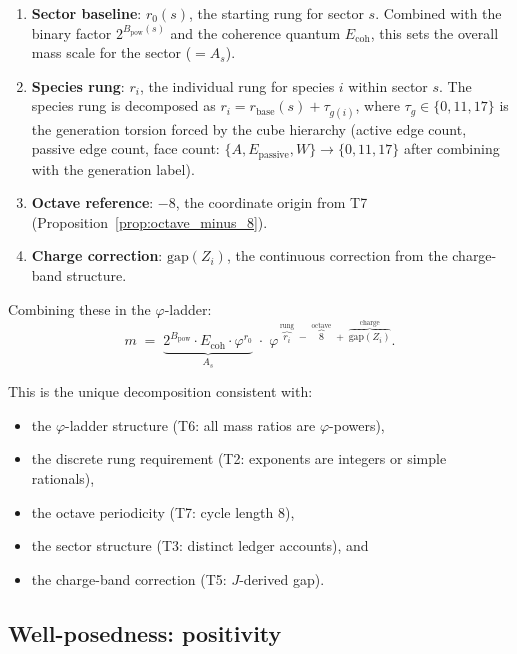 \documentclass[11pt,a4paper]{article}
\theoremstyle{definition}
\theoremstyle{remark}
\newcommand{\phig}{\varphi}
\newcommand{\Jcost}{J}
\newcommand{\Ecoh}{E_{\mathrm{coh}}}
\newcommand{\Epass}{E_{\mathrm{passive}}}
\newcommand{\Zidx}{Z}
\begin{document}
\begin{enumerate}[nosep]
  \item \textbf{Sector baseline}: $r_0(s)$, the starting rung for sector $s$.
        Combined with the binary factor $2^{B_{\mathrm{pow}}(s)}$ and the coherence
        quantum $\Ecoh$, this sets the overall mass scale for the sector
        ($= A_s$).

  \item \textbf{Species rung}: $r_i$, the individual rung for species $i$
        within sector $s$.  The species rung is decomposed as
        $r_i = r_{\mathrm{base}}(s) + \tau_{g(i)}$,
        where $\tau_{g} \in \{0, 11, 17\}$ is the generation torsion forced
        by the cube hierarchy (active edge count, passive edge count, face
        count: $\{A, \Epass, W\} \to \{0, 11, 17\}$ after combining with
        the generation label).

  \item \textbf{Octave reference}: $-8$, the coordinate origin from T7
        (Proposition~\ref{prop:octave_minus_8}).

  \item \textbf{Charge correction}: $\mathrm{gap}(\Zidx_i)$, the continuous
        correction from the charge-band structure.
\end{enumerate}

\noindent
Combining these in the $\phig$-ladder:
\[
  m \;=\; \underbrace{2^{B_{\mathrm{pow}}} \cdot \Ecoh \cdot
  \phig^{r_0}}_{\displaystyle A_s} \;\cdot\;
  \phig^{\,\overbrace{r_i}^{\text{rung}} \;-\;
  \overbrace{8}^{\text{octave}} \;+\;
  \overbrace{\mathrm{gap}(\Zidx_i)}^{\text{charge}}}.
\]

\noindent
This is the unique decomposition consistent with:
\begin{itemize}[nosep]
  \item the $\phig$-ladder structure (T6: all mass ratios are $\phig$-powers),
  \item the discrete rung requirement (T2: exponents are integers or simple
        rationals),
  \item the octave periodicity (T7: cycle length 8),
  \item the sector structure (T3: distinct ledger accounts), and
  \item the charge-band correction (T5: $\Jcost$-derived gap).
\end{itemize}

\subsection{Well-posedness: positivity}
\end{document}
